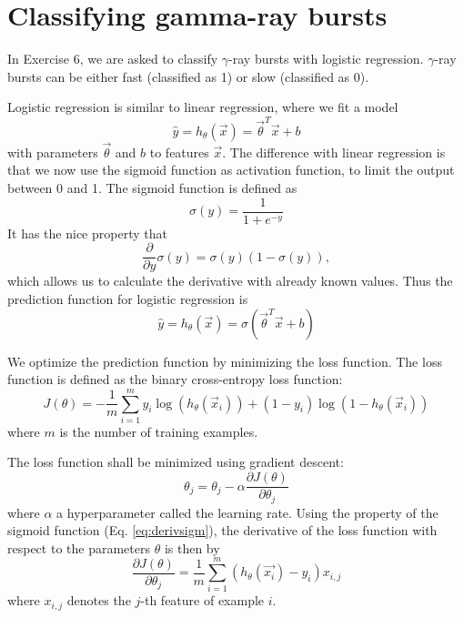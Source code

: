 \section{Classifying gamma-ray bursts}
In Exercise 6, we are asked to classify $\gamma$-ray bursts with logistic regression. $\gamma$-ray bursts can be either fast (classified as 1) or slow (classified as 0). 


Logistic regression is similar to linear regression, where we fit a model $$\hat{y} = h_\theta(\vec{x}) = \vec{\theta}^T \vec{x} + b$$ with parameters $\vec{\theta}$ and $b$ to features $\vec{x}$. The difference with linear regression is that we now use the sigmoid function as activation function, to limit the output between 0 and 1. The sigmoid function is defined as
\begin{equation}
\sigma(y) = \frac{1}{1+e^{-y}}
\end{equation}
It has the nice property that 
\begin{equation}\label{eq:derivsigm}
\frac{\partial }{\partial y} \sigma(y) = \sigma(y)(1-\sigma(y)),
\end{equation}
which allows us to calculate the derivative with already known values.
Thus the prediction function for logistic regression is
\begin{equation}
\hat{y} = h_\theta(\vec{x}) = \sigma( \vec{\theta}^T \vec{x} + b)
\end{equation}

We optimize the prediction function by minimizing the loss function. The loss function is defined as the binary cross-entropy loss function:
\begin{equation}
J(\theta) = -\frac{1}{m} \sum_{i=1}^{m} y_i \log(h_\theta(\vec{x}_i)) + (1-y_i) \log(1-h_\theta(\vec{x}_i))
\end{equation}
where $m$ is the number of training examples.

The loss function shall be minimized using gradient descent:
\begin{equation}
\theta_j = \theta_j - \alpha \frac{\partial J(\theta) }{\partial \theta_j}
\end{equation}
where $\alpha$ a hyperparameter called the learning rate. 
Using the property of the sigmoid function (Eq. \ref{eq:derivsigm}), the derivative of the loss function with respect to the parameters $\theta$ is then by
\begin{equation}
\frac{\partial J(\theta) }{\partial \theta_j} = \frac{1}{m} \sum_{i=1}^m (h_\theta(\vec{x_i}) - y_i) x_{i,j}
\end{equation}
where $x_{i,j}$ denotes the $j$-th feature of example $i$. 

